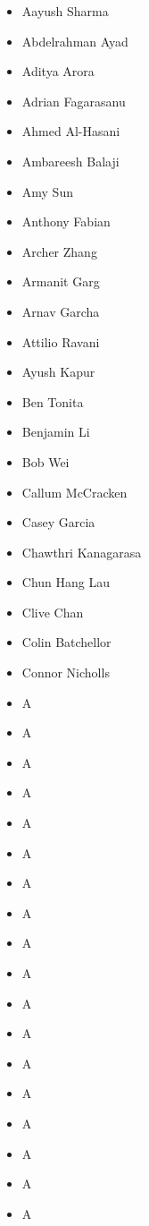 \documentclass[main.tex]{subfiles}
\begin{document}
\begin{multicols}{4}
 \begin{itemize}[label={},noitemsep]
     \item {Aayush Sharma}
     \item {Abdelrahman Ayad}
     \item {Aditya Arora}
     \item {Adrian Fagarasanu}
     \item {Ahmed Al-Hasani}
	 \item {Ambareesh Balaji}
     \item {Amy Sun}
	 \item {Anthony Fabian}
     \item {Archer Zhang}
	 \item {Armanit Garg}
     \item {Arnav Garcha}
	 \item {Attilio Ravani}
     \item {Ayush Kapur}
	 \item {Ben Tonita}
     \item {Benjamin Li}
	 \item {Bob Wei}
     \item {Callum McCracken}
	 \item {Casey Garcia}
     \item {Chawthri Kanagarasa}
	 \item {Chun Hang Lau}
     \item {Clive Chan}
	 \item {Colin Batchellor}
     \item {Connor Nicholls}
	 \item {A}
     \item {A}
	 \item {A}
     \item {A}
	 \item {A}
     \item {A}
	 \item {A}
     \item {A}
	 \item {A}
     \item {A}
	 \item {A}
     \item {A}
	 \item {A}
     \item {A}
	 \item {A}
     \item {A}
	 \item {A}
     \item {A}

\end{itemize}
\end{multicols}
\end{document}
